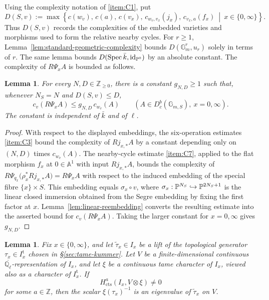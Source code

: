 \documentclass[12pt,reqno]{amsart}
\theoremstyle{definition}
\theoremstyle{plain}
\newtheorem{lem}[para]{Lemma}
\theoremstyle{definition}
\theoremstyle{remark}
\newcommand{\bbA}{\mathbb{A}}  \newcommand{\bbB}{\mathbb{B}}
\newcommand{\bbG}{\mathbb{G}}  \newcommand{\bbH}{\mathbb{H}}
\newcommand{\bbQ}{\mathbb{Q}}  \newcommand{\bbR}{\mathbb{R}}
\newcommand{\ol}[1]{\overline{#1}}
\newcommand{\Ql}{\bbQ_{\ell}}
\newcommand{\Db}{D^b_c}
\newcommand{\Gm}{\bbG_m}
\begin{document}
Using the complexity notation of \ref{item:C1}, put
\begin{equation}
\label{eq:relative-geometric-complexity}
 D(S,v):=
 \max\left\{
 c(w_v),\,c(a),\,c(v_x),\,c_{w_v,v_x}(j_x),\,c_{v_x,a}(f_x)
 \ \middle|\ x\in\{0,\infty\}
 \right\}.
\end{equation}
Thus \(D(S,v)\) records the complexities of the embedded varieties and morphisms used to form the
relative nearby cycles.  For \(r\ge1\), Lemma~\ref{lem:standard-geometric-complexity} bounds
\(D(\Gm^r,u_r)\) solely in terms of \(r\).  The same lemma bounds
\(D(\operatorname{Spec}\bar k,\operatorname{id}_{\mathbb{P}^0})\) by an absolute constant.  The complexity of
\(R\Psi_x A\) is bounded as follows.

\begin{lem}
\label{lem:coordinate-nearby-complexity}
For every \(N,D\in\mathbb Z_{\ge0}\), there is a constant \(g_{N,D}\ge1\) such that, whenever \(N_S=N\) and
\(D(S,v)\le D\),
\[
        c_v(R\Psi_x A)\le g_{N,D}\,c_{w_v}(A)
        \qquad(A\in\Db(\bbG_{m,S}),\ x=0,\infty).
\]
The constant is independent of \(\bar k\) and of \(\ell\).
\end{lem}

\begin{proof}
With respect to the displayed embeddings, the six-operation estimates \ref{item:C3} bound the
complexity of \(Rj_{x,*}A\) by a constant depending only on \((N,D)\) times \(c_{w_v}(A)\).
The nearby-cycle estimate \ref{item:C7}, applied to the flat morphism \(f_x\) at \(0\in\bbA^1\) with input
\(Rj_{x,*}A\), bounds the complexity of
\(R\Psi_{q_x}\bigl(\rho_x^*Rj_{x,*}A\bigr)=R\Psi_xA\) with respect to the induced embedding of the
special fibre \(\{x\}\times S\).  This embedding equals \(\sigma_x\circ v\), where
\(\sigma_x:\mathbb{P}^{N_S}\hookrightarrow\mathbb{P}^{2N_S+1}\) is the linear closed immersion obtained from the
Segre embedding by fixing the first factor at \(x\).
Lemma~\ref{lem:linear-reembedding} converts the resulting estimate into the asserted bound for
\(c_v(R\Psi_xA)\).  Taking the larger constant for \(x=0,\infty\) gives \(g_{N,D}\).
\end{proof}

\begin{lem}
\label{lem:inertia-eigenvalue}
Fix \(x\in\{0,\infty\}\), and let \(\widetilde\tau_x\in I_x\) be a lift of the topological generator
\(\tau_x\in I_x^{\mathrm t}\) chosen in \S\ref{sec:tame-kummer}.  Let \(V\) be a finite-dimensional
continuous \(\ol\Ql\)-representation of \(I_x\), and let \(\xi\) be a continuous
tame character of \(I_x\), viewed also as a character of \(I_x^{\mathrm t}\).  If
\[
        H^a_{\mathrm{cts}}(I_x,V\otimes\xi)\neq0
\]
for some \(a\in\mathbb Z\), then the scalar \(\xi(\tau_x)^{-1}\) is an eigenvalue of
\(\widetilde\tau_x\) on \(V\).
\end{lem}
\end{document}

